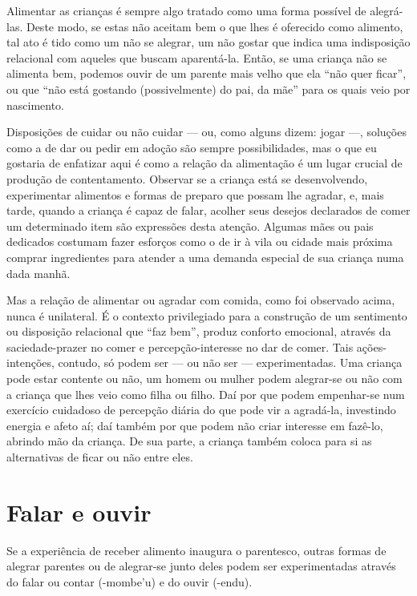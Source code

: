 Alimentar as crianças é sempre algo tratado como uma forma possível de
alegrá-las. Deste modo, se estas não aceitam bem o que lhes é oferecido
como alimento, tal ato é tido como um não se alegrar, um não gostar que
indica uma indisposição relacional com aqueles que buscam aparentá-la.
Então, se uma criança não se alimenta bem, podemos ouvir de um parente
mais velho que ela ``não quer ficar'', ou que ``não está gostando
(possivelmente) do pai, da mãe'' para os quais veio por nascimento.

Disposições de cuidar ou não cuidar --- ou, como alguns dizem: jogar ---,
soluções como a de dar ou pedir em adoção são sempre possibilidades,
mas o que eu gostaria de enfatizar aqui é como a relação da alimentação
é um lugar crucial de produção de contentamento. Observar se a criança
está se desenvolvendo, experimentar alimentos e formas de preparo que
possam lhe agradar, e, mais tarde, quando a criança é capaz de falar,
acolher seus desejos declarados de comer um determinado item são
expressões desta atenção. Algumas mães ou pais dedicados costumam fazer
esforços como o de ir à vila ou cidade mais próxima comprar
ingredientes para atender a uma demanda especial de sua criança numa
dada manhã.

Mas a relação de alimentar ou agradar com comida, como foi observado
acima, nunca é unilateral. É o contexto privilegiado para a construção
de um sentimento ou disposição relacional que ``faz bem'', produz
conforto emocional, através da saciedade-prazer no comer e
percepção-interesse no dar de comer. Tais ações-intenções, contudo, só
podem ser --- ou não ser --- experimentadas. Uma criança pode estar
contente ou não, um homem ou mulher podem alegrar-se ou não com a
criança que lhes veio como filha ou filho. Daí por que podem
empenhar-se num exercício cuidadoso de percepção diária do que pode vir
a agradá-la, investindo energia e afeto aí; daí também por que podem
não criar interesse em fazê-lo, abrindo mão da criança. De sua parte, a
criança também coloca para si as alternativas de ficar ou não entre
eles. 

\section{Falar e ouvir}

Se a experiência de receber alimento inaugura o parentesco, outras
formas de alegrar parentes ou de alegrar-se junto deles podem ser
experimentadas através do falar ou contar (-mombe’u) e do ouvir
(-endu).

